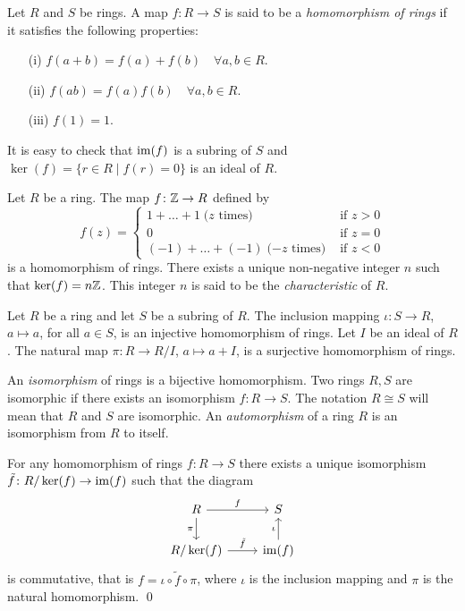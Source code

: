 Let $R$ and $S$ be rings. A map $f\colon R\rightarrow S$
is said to be a {\em homomorphism of rings} if it satisfies the following properties:
\begin{itemize}
	\item[(i)] $f(a+b)=f(a)+f(b)\quad\forall a,b\in R$.
    \item[(ii)] $f(ab)=f(a)f(b)\quad\forall a,b\in R$.
    \item[(iii)] $f(1)=1$.
\end{itemize}




It is easy to check that $\operatorname{im}(f)$ is a subring of $S$ and
$\ker(f)=\{ r\in R\mid f(r)=0\}$ is an ideal of $R$.

\begin{example}
Let  $R$ be a ring. The map $f\colon \mathbb{Z}\rightarrow R$ defined by
$$f(z)=\left\{\begin{array}{ll}
1+\dots +1\;\mbox{($z$ times)}&\mbox{ if } z>0\\
0&\mbox{ if } z=0\\
(-1)+\dots+(-1)\;\mbox{($-z$ times)}&\mbox{ if } z<0\end{array}\right.
$$
is a homomorphism of rings. There exists a unique non-negative integer $n$ such that
$\ker(f)=n\mathbb{Z}$. This integer $n$ is said to be the {\em characteristic} of $R$.
\end{example}

\begin{example} Let $R$ be a ring and let $S$ be a subring of $R$. The inclusion mapping $\iota\colon S\rightarrow R$, $a\mapsto a$, for all $a\in S$, is an injective homomorphism of rings. Let $I$ be an ideal of $R$. The natural map $\pi\colon R\rightarrow R/I$, $a\mapsto a+I$, is a surjective homomorphism of rings.  
\end{example}


An {\em isomorphism} of rings is a bijective homomorphism. Two rings $R,S$ are isomorphic if there exists an isomorphism $f\colon R\rightarrow S$. The notation $R\cong S$ will mean that $R$ and $S$ are isomorphic. An {\em automorphism} of a ring $R$ is an isomorphism from $R$ to itself. 

\begin{theorem}
	For any homomorphism of rings $f\colon R\rightarrow S$ there exists a unique isomorphism 
	$\tilde f\colon R/\ker(f)\rightarrow\operatorname{im}(f)$ such that the diagram
	\[\begin{tikzcd}
		{R} & {S} \\
		{R/\ker(f)} & {\im(f)}
		\arrow["f", from=1-1, to=1-2]
		\arrow["{\pi}"', from=1-1, to=2-1]
		\arrow["{\iota}", from=2-2, to=1-2]
		\arrow["{\tilde f}", from=2-1, to=2-2]
	\end{tikzcd}
	\]
	is commutative, that is $f=\iota\circ \tilde f\circ\pi$, where $\iota$ is the inclusion mapping and $\pi$ is the natural homomorphism. \qed	
\end{theorem} 

